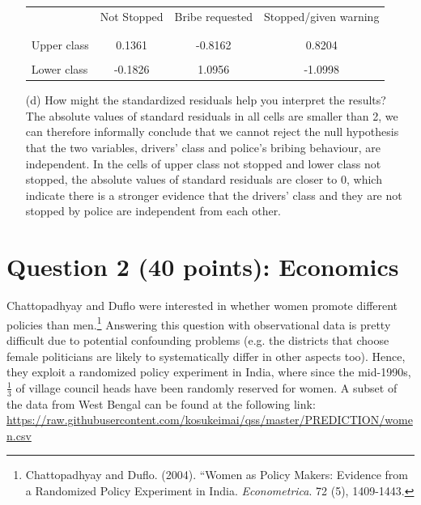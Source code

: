 \documentclass[12pt,letterpaper]{article}
\begin{document}
\begin{enumerate}
	
	\begin{table}[h]
		\centering
		\begin{tabular}{l | c c c }
			& Not Stopped & Bribe requested & Stopped/given warning \\
			\\[-1.8ex] 
			\hline \\[-1.8ex]
			Upper class  & 0.1361 & -0.8162 & 0.8204 \\
			\\
			Lower class & -0.1826 & 1.0956  & -1.0998  \\
			
		\end{tabular}
	\end{table}
	
	
	\vspace{7cm}
	\item [(d)] How might the standardized residuals help you interpret the results?  \\
	 The absolute values of standard residuals in all cells are smaller than 2, we can therefore informally conclude that we cannot reject the null hypothesis that the two variables, drivers' class and police's bribing behaviour, are independent. In the cells of upper class not stopped and lower class not stopped, the absolute values of standard residuals are closer to 0, which indicate there is a stronger evidence that the drivers' class and they are not stopped by police are independent from each other. 
	
	
\end{enumerate}
\newpage

\section*{Question 2 (40 points): Economics}
Chattopadhyay and Duflo were interested in whether women promote different policies than men.\footnote{Chattopadhyay and Duflo. (2004). ``Women as Policy Makers: Evidence from a Randomized Policy Experiment in India. \textit{Econometrica}. 72 (5), 1409-1443.} Answering this question with observational data is pretty difficult due to potential confounding problems (e.g. the districts that choose female politicians are likely to systematically differ in other aspects too). Hence, they exploit a randomized policy experiment in India, where since the mid-1990s, $\frac{1}{3}$ of village council heads have been randomly reserved for women. A subset of the data from West Bengal can be found at the following link: \url{https://raw.githubusercontent.com/kosukeimai/qss/master/PREDICTION/women.csv}\\
\end{document}

